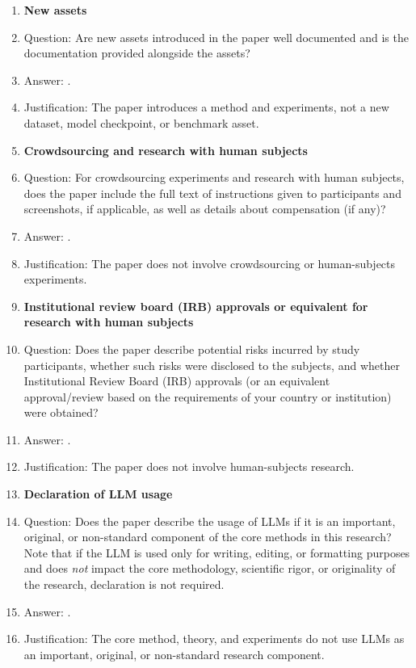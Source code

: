 \begin{enumerate}
\item {\bf New assets}
    \item[] Question: Are new assets introduced in the paper well documented and is the documentation provided alongside the assets?
    \item[] Answer: \answerNA{}.
    \item[] Justification: The paper introduces a method and experiments, not a new dataset, model checkpoint, or benchmark asset.

\item {\bf Crowdsourcing and research with human subjects}
    \item[] Question: For crowdsourcing experiments and research with human subjects, does the paper include the full text of instructions given to participants and screenshots, if applicable, as well as details about compensation (if any)?
    \item[] Answer: \answerNA{}.
    \item[] Justification: The paper does not involve crowdsourcing or human-subjects experiments.

\item {\bf Institutional review board (IRB) approvals or equivalent for research with human subjects}
    \item[] Question: Does the paper describe potential risks incurred by study participants, whether such risks were disclosed to the subjects, and whether Institutional Review Board (IRB) approvals (or an equivalent approval/review based on the requirements of your country or institution) were obtained?
    \item[] Answer: \answerNA{}.
    \item[] Justification: The paper does not involve human-subjects research.

\item {\bf Declaration of LLM usage}
    \item[] Question: Does the paper describe the usage of LLMs if it is an important, original, or non-standard component of the core methods in this research? Note that if the LLM is used only for writing, editing, or formatting purposes and does \emph{not} impact the core methodology, scientific rigor, or originality of the research, declaration is not required.
    \item[] Answer: \answerNA{}.
    \item[] Justification: The core method, theory, and experiments do not use LLMs as an important, original, or non-standard research component.

\end{enumerate}
